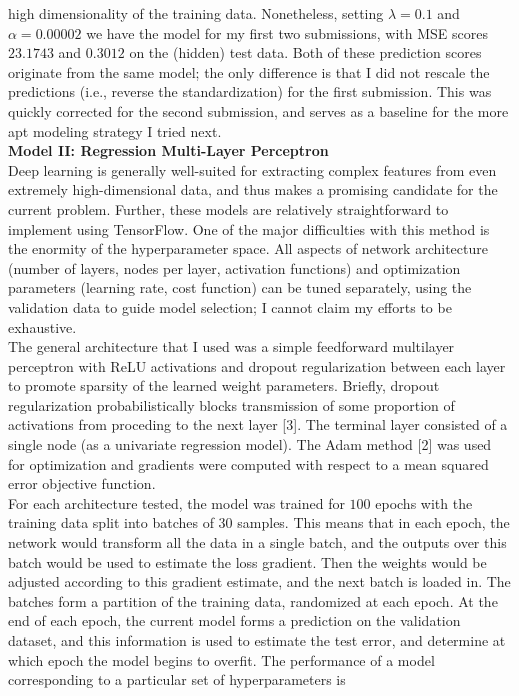 \documentclass[11pt]{article}
\newcommand{\1}[1]{\mathbbm{1}_{#1}}
\begin{document}
high dimensionality of the training data. Nonetheless, setting $\lambda=0.1$ and $\alpha=0.00002$ we have the model for my first two submissions, with MSE scores $23.1743$ and $0.3012$ on the (hidden) test data. Both of these prediction scores originate from the same model; the only difference is that I did not rescale the predictions (i.e., reverse the standardization) for
the first submission. This was quickly corrected for the second submission, and serves as a baseline for the more apt modeling strategy I tried next.\\[5pt]
{\bf\large Model II: Regression Multi-Layer Perceptron}\\[5pt]
Deep learning is generally well-suited for extracting complex features from even extremely high-dimensional data, and thus makes a promising candidate for the current problem. Further, these models are relatively straightforward to implement using TensorFlow. One of the major difficulties with this method is the enormity of the hyperparameter space. 
All aspects of network architecture (number of layers, nodes per layer, activation functions) and optimization parameters (learning rate, cost function) can be tuned separately, using the validation data to guide model selection; I cannot claim my efforts to be exhaustive.\\[5pt]
The general architecture that I used was a simple feedforward multilayer perceptron with ReLU activations and dropout regularization between each layer to promote sparsity of the learned weight parameters. Briefly, dropout regularization probabilistically blocks transmission of some proportion of activations
from proceding to the next layer [3]. The terminal layer consisted of a single node (as a univariate regression model). The Adam method [2] was used for optimization and gradients were computed with respect to a mean squared error objective function.\\[5pt]
For each architecture tested, the model was trained for $100$ epochs with the training data split into batches of $30$ samples. This means that in each epoch, the network would transform all the data in a single batch, and the outputs over this batch would be used to estimate the loss gradient. Then the weights would be adjusted according to this gradient estimate, and the next batch
is loaded in. The batches form a partition of the training data, randomized at each epoch. At the end of each epoch, the current model forms a prediction on the validation dataset, and this information is used to estimate the test error, and determine at which epoch the model begins to overfit. The performance of a model corresponding to a particular set of hyperparameters is
\end{document}
